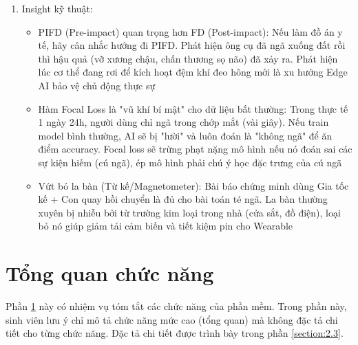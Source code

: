 \documentclass[../DoAn.tex]{subfiles}
\begin{document}
\begin{enumerate}[label=\arabic*)]
    \begin{itemize}
        \item Áp dụng trực tiếp: Pipeline thu thập dữ liệu bằng ESP32 + IMU (sampling 100Hz) và cắt cửa sổ trượt 1 giây. Kiến trúc phần cứng này hoàn toàn có thể tái sử dụng.
        \item KHÔNG phù hợp: Không thể đem nguyên file model 22.4 MB nhét vào ESP32
        \item Đề xuất tối ưu (Cho đồ án Edge AI): Nếu muốn chạy on-device (trên vi điều khiển đeo ở hông), bạn phải cắt bỏ nhánh Bi-GRU (rất tốn RAM/tính toán), chỉ giữ lại nhánh CNN 1D + thuật toán Quantization (lượng tử hóa INT8 qua TensorFlow Lite for Microcontrollers). Đổi lại, bạn có thể phải chấp nhận bài toán chuyển từ PIFD (phát hiện trước va chạm) về FD (phát hiện sau va chạm) cho nhẹ tính toán.
    \end{itemize}
    \item Insight kỹ thuật:
    \begin{itemize}
        \item PIFD (Pre-impact) quan trọng hơn FD (Post-impact): Nếu làm đồ án y tế, hãy cân nhắc hướng đi PIFD. Phát hiện ông cụ đã ngã xuống đất rồi thì hậu quả (vỡ xương chậu, chấn thương sọ não) đã xảy ra. Phát hiện lúc cơ thể đang rơi để kích hoạt đệm khí đeo hông mới là xu hướng Edge AI bảo vệ chủ động thực sự
        \item Hàm Focal Loss là "vũ khí bí mật" cho dữ liệu bất thường: Trong thực tế 1 ngày 24h, người dùng chỉ ngã trong chớp mắt (vài giây). Nếu train model bình thường, AI sẽ bị "lười" và luôn đoán là "không ngã" để ăn điểm accuracy. Focal loss sẽ trừng phạt nặng mô hình nếu nó đoán sai các sự kiện hiếm (cú ngã), ép mô hình phải chú ý học đặc trưng của cú ngã
        \item Vứt bỏ la bàn (Từ kế/Magnetometer): Bài báo chứng minh dùng Gia tốc kế + Con quay hồi chuyển là đủ cho bài toán té ngã. La bàn thường xuyên bị nhiễu bởi từ trường kim loại trong nhà (cửa sắt, đồ điện), loại bỏ nó giúp giảm tải cảm biến và tiết kiệm pin cho Wearable
    \end{itemize}
\end{enumerate}

\section{Tổng quan chức năng}
\label{section:2.2}
Phần \ref{section:2.2} này có nhiệm vụ tóm tắt các chức năng của phần mềm. Trong phần này, sinh viên lưu ý chỉ mô tả chức năng mức cao (tổng quan) mà không đặc tả chi tiết cho từng chức năng. Đặc tả chi tiết được trình bày trong phần \ref{section:2.3}.
\end{document}
